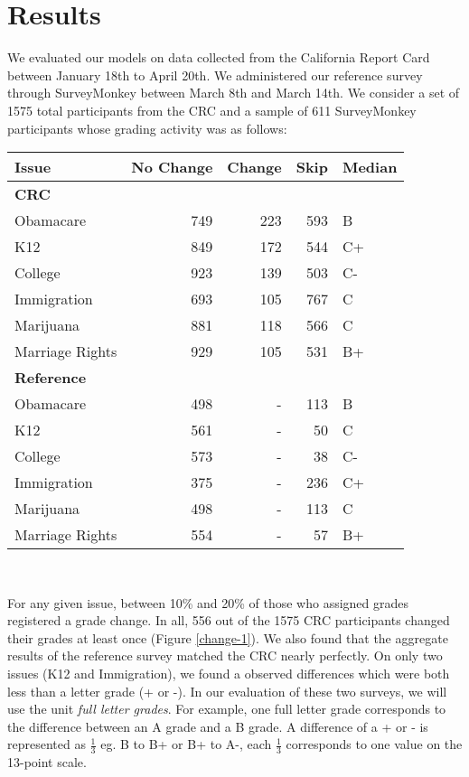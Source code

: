 \section{Results}
We evaluated our models on data collected from the California Report Card between January 18th to April 20th.
We administered our reference survey through SurveyMonkey between March 8th and March 14th.
We consider a set of 1575 total participants from the CRC and a sample of 611 SurveyMonkey participants whose grading activity was as follows:\\[1\baselineskip]

{\centering\scriptsize
\begin{tabular}[!ht]{ l | r | r | r | l }
Issue & No Change & Change & Skip & Median \\
\hline
\hline
  \multicolumn{5}{l}{\textbf{CRC}}\\
  \hline
  Obamacare & 749 & 223 & 593 & B \\
  \hline
  K12 & 849 & 172 & 544 & C+ \\
  \hline
  College & 923 & 139 & 503 & C-\\
  \hline
  Immigration & 693 & 105 & 767 & C \\
  \hline
  Marijuana & 881 & 118 & 566 & C \\
  \hline
  Marriage Rights & 929 & 105 & 531 & B+\\
\hline
\hline
\multicolumn{5}{l}{\textbf{Reference}}\\
\hline
  Obamacare & 498 & - & 113 & B \\
  \hline
  K12 & 561 & - & 50 & C \\
  \hline
  College & 573 & - & 38 & C-\\
  \hline
  Immigration & 375 & - & 236 & C+ \\
  \hline
  Marijuana & 498 & - & 113 & C \\
  \hline
  Marriage Rights & 554 & - & 57 & B+
\end{tabular}\\[1\baselineskip]
}

For any given issue, between 10\% and 20\% of those who assigned grades registered a grade change.
In all, 556 out of the 1575 CRC participants changed their grades at least once (Figure \ref{change-1}).
We also found that the aggregate results of the reference survey matched the CRC nearly perfectly.
On only two issues (K12 and Immigration), we found a observed differences which were both less than a letter grade (+ or -).
In our evaluation of these two surveys, we will use the unit \emph{full letter grades}.
For example, one full letter grade corresponds to the difference between an A grade and a B grade. 
A difference of a + or - is represented as $\frac{1}{3}$ eg. B to B+ or B+ to A-, each $\frac{1}{3}$ corresponds to one value on the 13-point scale.

